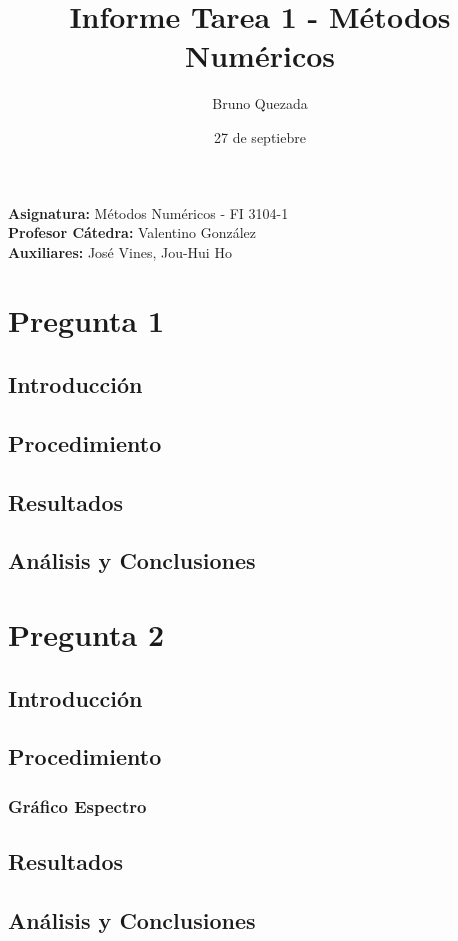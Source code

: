 \documentclass[10pt,a4paper]{article}
\title{Informe Tarea 1 - M\'etodos Num\'ericos}
\author{Bruno Quezada}
\date{27 de septiebre}
\begin{document}
\maketitle

\vspace{17cm}
\begin{flushright}
\textbf{Asignatura:} Métodos Numéricos - FI 3104-1\\
\textbf{Profesor Cátedra:} Valentino González\\
\textbf{Auxiliares:} José Vines, Jou-Hui Ho \\
\end{flushright}
\pagebreak



\section{Pregunta 1}



\subsection{Introducción}


\subsection{Procedimiento}


\subsection{Resultados}


\subsection{Análisis y Conclusiones}


\section{Pregunta 2}



\subsection{Introducción}


\subsection{Procedimiento}


\subsubsection{Gráfico Espectro}


\subsection{Resultados}


\subsection{Análisis y Conclusiones}
\end{document}
